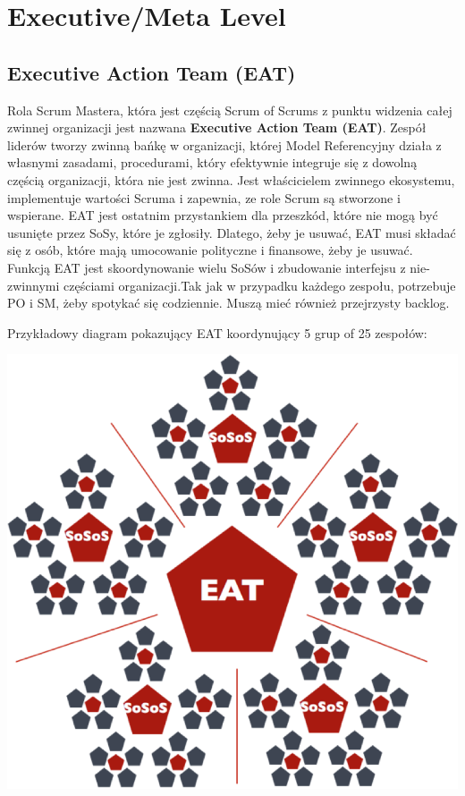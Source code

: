 \documentclass[12pt,a4paper,parskip=full]{scrartcl}
\begin{document}
\section{Executive/Meta Level}

\subsection{Executive Action Team (EAT)}

Rola Scrum Mastera, która jest częścią Scrum of Scrums z punktu widzenia całej zwinnej organizacji jest nazwana \textbf{Executive Action Team (EAT)}. Zespół liderów tworzy zwinną bańkę w organizacji, której Model Referencyjny działa z własnymi zasadami, procedurami, który efektywnie integruje się z dowolną częścią organizacji, która nie jest zwinna. Jest właścicielem zwinnego ekosystemu, implementuje wartości Scruma i zapewnia, ze role Scrum są stworzone i wspierane.
EAT jest ostatnim przystankiem dla przeszkód, które nie mogą być usunięte przez SoSy, które je zgłosiły. Dlatego, żeby je usuwać, EAT musi składać się z osób, które mają umocowanie polityczne i finansowe, żeby je usuwać. Funkcją EAT jest skoordynowanie wielu SoSów i zbudowanie interfejsu z nie-zwinnymi częściami organizacji.Tak jak w przypadku każdego zespołu, potrzebuje PO i SM, żeby spotykać się codziennie. Muszą mieć również przejrzysty backlog.

Przykładowy diagram pokazujący EAT koordynujący 5 grup of 25 zespołów:

\includegraphics[width=\textwidth,height=\textheight,keepaspectratio]{SoS-EAT.png}
\end{document}

